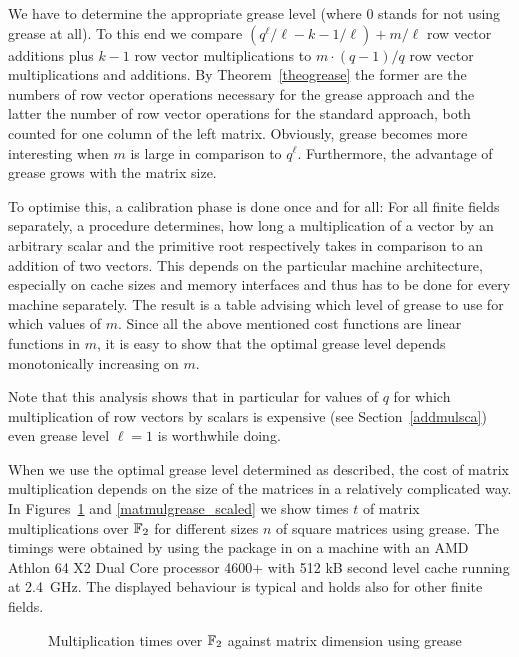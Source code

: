 We have to determine the appropriate grease level (where $0$ stands for not
using grease at all). To this end we 
compare $(q^\ell/\ell - k - 1/\ell) + m/\ell$ 
row vector additions plus $k-1$ row vector multiplications to
$m \cdot (q-1)/q$ row vector multiplications and additions.
By Theorem~\ref{theogrease} the former are the numbers of row vector
operations necessary for the grease approach and the latter the number
of row vector operations for the standard approach, both counted for
one column of the left matrix. Obviously, grease becomes more interesting 
when $m$ is large in comparison to $q^\ell$. 
Furthermore, the advantage of grease
grows with the matrix size.

To optimise this, a calibration phase is done once and for all: For all finite
%
fields separately, a procedure determines, how long a multiplication
of a vector by an arbitrary scalar and the primitive root respectively
takes in comparison to an addition of two vectors.
This depends on the particular machine architecture, especially on 
cache sizes and memory interfaces and thus has to be done for every
machine separately. The result is a table advising which level of grease
to use for which values of $m$. Since all the above mentioned cost
functions are linear functions in $m$, it is easy to show that the
optimal grease level depends monotonically increasing on $m$.

Note that this analysis shows that in particular for values of $q$
for which multiplication of row vectors by scalars is expensive (see
Section~\ref{addmulsca}) even grease level $\ell = 1$ is worthwhile
doing.

When we use the optimal grease level determined as described, the
cost of matrix multiplication depends on the size of the matrices
in a relatively complicated way. In Figures~\ref{matmulgrease} and
\ref{matmulgrease_scaled} we show times $t$ of matrix multiplications
over $\mathbb{F}_2$ for different sizes $n$ of square matrices using grease.
The timings were obtained by using the {\cvec} package in {\GAP} on a
machine with an AMD Athlon 64 X2 Dual Core processor 4600+ with 512
kB second level cache running at 2.4~GHz. The displayed behaviour is
typical and holds also for other finite fields.

\begin{figure}[ht]
\begin{center}
\end{center}
\caption{Multiplication times over $\mathbb{F}_2$ against matrix dimension
using grease}
%
\label{matmulgrease}
\end{figure}

